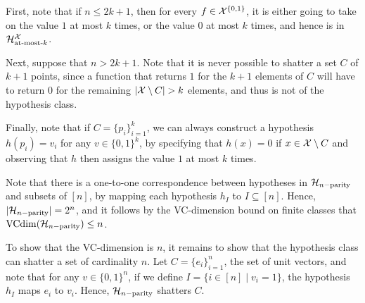 \begin{ex}
\begin{enumerate}
          First, note that if $n\leq 2k+1$, then for every $f\in \mathcal{X}^{\{0, 1\}}$,
          it is either going to take on the value $1$ at most $k$ times, or the
          value $0$ at most $k$ times, and hence is in
          $\mathcal{H}^{\mathcal{X}}_{\text{at-most-$k$}}$.

          Next, suppose that $n>2k+1$. Note that it is never possible to shatter
          a set $C$ of $k+1$ points, since a function that returns $1$ for the
          $k+1$ elements of $C$ will have to return $0$ for the remaining
          $|\X\setminus C|>k$ elements, and thus is not of the hypothesis class.

          Finally, note that if $C=\{p_i\}_{i=1}^k$, we can always construct a
          hypothesis $h(p_i)=v_i$ for any $v\in \{0,1\}^k$, by specifying that
          $h(x)=0$ if $x\in \mathcal{X}\setminus C$ and observing that $h$ then assigns
          the value $1$ at most $k$ times.
  \end{enumerate}
\end{ex}

\begin{ex}
  Note that there is a one-to-one correspondence between hypotheses in
  $\mathcal{H}_{n-\text{parity}}$ and subsets of $[n]$, by mapping each hypothesis $h_I$
  to $I\subseteq [n]$. Hence, $|\mathcal{H}_{n-\text{parity}}|=2^n$, and it follows by
  the VC-dimension bound on finite classes that
  $\operatorname*{VCdim}(\mathcal{H}_{n-\text{parity}})\leq n$.

  To show that the VC-dimension is $n$, it remains to show that the hypothesis
  class can shatter a set of cardinality $n$. Let $C=\{e_i\}_{i=1}^n$, the set
  of unit vectors, and note that for any $v\in \{0, 1\}^n$, if we define
  $I=\{i\in [n]\mid v_i = 1 \}$, the hypothesis $h_I$ maps $e_i$ to $v_i$.
  Hence, $\mathcal{H}_{n-\text{parity}}$ shatters $C$.
\end{ex}

\begin{ex}
\end{ex}

